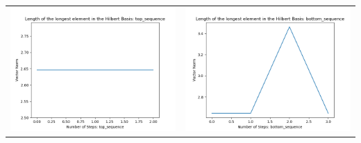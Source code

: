 \documentclass[10pt]{article}
\begin{document}
\begin{tabular}{c|c}
\begin{minipage}{.45\textwidth}
\includegraphics[width=\textwidth]{"DATA/5d/6 generators 1 bound G/top_sequence LENGTH"}
\end{minipage} &
\begin{minipage}{.45\textwidth}
\includegraphics[width=\textwidth]{"DATA/5d/6 generators 1 bound G bottomup/bottom_sequence LENGTH"}
\end{minipage}
\end{tabular}
\end{document}

